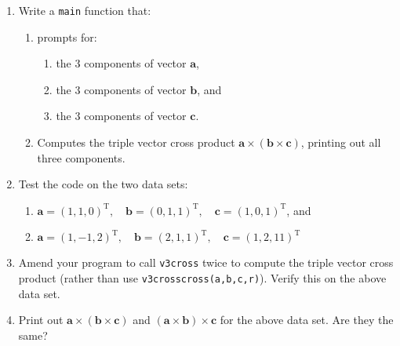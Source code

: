 \documentclass[a4paper,12pt]{article}
\begin{document}
\begin{enumerate}
\item Write a {\tt main} function that:
\begin{enumerate}
\item prompts for:
\begin{enumerate}
\item the 3 components of vector $\mathbf{a}$,
\item the 3 components of vector $\mathbf{b}$, and
\item the 3 components of vector $\mathbf{c}$.
\end{enumerate}
\item Computes the triple vector cross product $\mathbf{a}\times(\mathbf{b}\times\mathbf{c})$, printing out all three components.
\end{enumerate}
\item Test the code on the two data sets:
\begin{enumerate}
\item $\mathbf{a} = (1,1,0)^\mathrm{T}, \quad \mathbf{b} = (0, 1,1)^\mathrm{T}, \quad \mathbf{c} = (1, 0, 1)^\mathrm{T}$, and
\item $\mathbf{a} = (1,-1,2)^\mathrm{T}, \quad \mathbf{b} = (2,1,1)^\mathrm{T},
\quad \mathbf{c} = (1,2,11)^\mathrm{T}$
\end{enumerate}
\item Amend your program to call {\tt v3cross} twice to compute the triple vector cross product (rather than use {\tt v3crosscross(a,b,c,r)}). Verify this on the above data set.
\item Print out $\mathbf{a}\times(\mathbf{b}\times\mathbf{c})$ and
$(\mathbf{a}\times\mathbf{b})\times\mathbf{c}$ for the above data set. Are they the same?
\end{enumerate}
\end{document}
